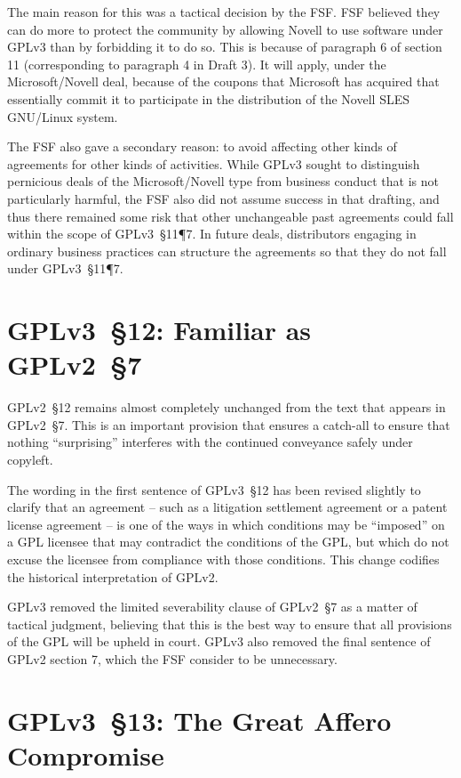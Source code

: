 The main reason for this was a tactical decision by the FSF.  FSF believed they can do more to
protect the community by allowing Novell to use software under GPLv3
than by forbidding it to do so.  This is because of
paragraph 6 of section 11 (corresponding to paragraph 4 in Draft 3).
It will apply, under the Microsoft/Novell deal, because of the coupons
that Microsoft has acquired that essentially commit it to participate
in the distribution of the Novell SLES GNU/Linux system.

The FSF also gave a secondary reason:  to avoid affecting other kinds of agreements for
other kinds of activities.  While GPLv3 sought to 
distinguish pernicious deals of the Microsoft/Novell type from
business conduct that is not particularly harmful, the FSF also did not
assume success in that drafting, and thus there remained some risk that other
unchangeable past agreements could fall within the  scope of GPLv3~\S11\P7.
In future deals, distributors engaging in ordinary business practices
can structure the agreements so that they do not fall under GPLv3~\S11\P7.

\section{GPLv3~\S12: Familiar as GPLv2~\S7}
\label{GPLv3s12}

GPLv2~\S12 remains almost completely unchanged from the text that appears in
GPLv2~\S7.  This is an important provision that ensures a catch-all to ensure
that nothing ``surprising'' interferes with the continued conveyance safely
under copyleft.

The wording in the first sentence of GPLv3~\S12 has been revised slightly to
clarify that an agreement -- such as a litigation settlement agreement or a
patent license agreement -- is one of the ways in which conditions may be
``imposed'' on a GPL licensee that may contradict the conditions of the GPL,
but which do not excuse the licensee from compliance with those conditions.
This change codifies the historical interpretation of GPLv2.

GPLv3 removed the limited severability clause of GPLv2~\S7 as a
matter of tactical judgment, believing that this is the best way to ensure
that all provisions of the GPL will be upheld in court. GPLv3 also removed
the final sentence of GPLv2 section 7, which the FSF consider to be unnecessary.

\section{GPLv3~\S13: The Great Affero Compromise}

